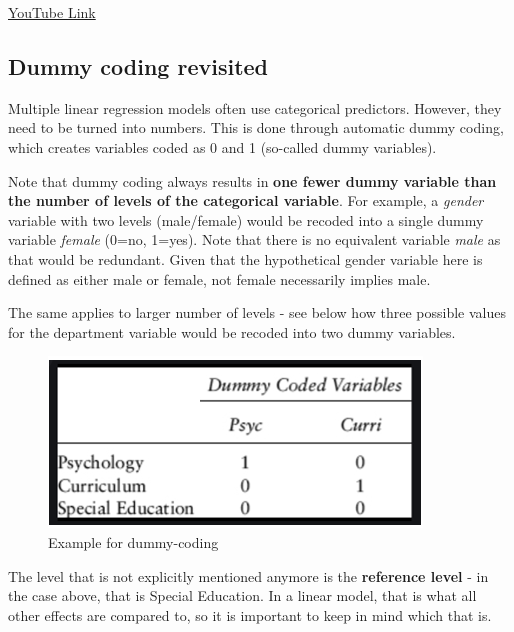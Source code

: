 \documentclass[
]{book}
\begin{document}
\textcolor{blue}{\href{https://www.youtube.com/embed/6lcDzTlsGVE?rel=0&modestbranding=1&loop=1&playlist=sk7TT5qM5Hw}{YouTube Link}}

\hypertarget{dummy-coding-revisited}{%
\subsection{Dummy coding revisited}\label{dummy-coding-revisited}}

Multiple linear regression models often use categorical predictors.
However, they need to be turned into numbers. This is done through
automatic dummy coding, which creates variables coded as 0 and 1
(so-called dummy variables).

Note that dummy coding always results in \textbf{one fewer dummy variable than
the number of levels of the categorical variable}. For example, a
\emph{gender} variable with two levels (male/female) would be recoded into a
single dummy variable \emph{female} (0=no, 1=yes). Note that there is no
equivalent variable \emph{male} as that would be redundant. Given that the
hypothetical gender variable here is defined as either male or female,
not female necessarily implies male.

The same applies to larger number of levels - see below how three
possible values for the department variable would be recoded into two
dummy variables.

\begin{figure}

{\centering \includegraphics[width=1\linewidth]{./images/W10Dummy} 

}

\caption{Example for dummy-coding}\label{fig:img-dummy-coding}
\end{figure}

The level that is not explicitly mentioned anymore is the \textbf{reference
level} - in the case above, that is Special Education. In a linear
model, that is what all other effects are compared to, so it is
important to keep in mind which that is.
\end{document}
